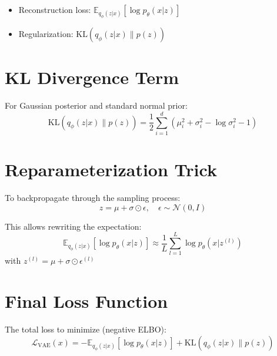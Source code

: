 \documentclass{article}
\begin{document}
\begin{itemize}
    \item Reconstruction loss: $\mathbb{E}_{q_{\phi}(z|x)}[\log p_{\theta}(x|z)]$
    \item Regularization: $\mathrm{KL}(q_{\phi}(z|x) \| p(z))$
\end{itemize}

\section*{KL Divergence Term}

For Gaussian posterior and standard normal prior:
\[
\mathrm{KL}(q_{\phi}(z|x) \| p(z)) = \frac{1}{2} \sum_{i=1}^{d} \left( \mu_i^2 + \sigma_i^2 - \log \sigma_i^2 - 1 \right)
\]

\section*{Reparameterization Trick}

To backpropagate through the sampling process:
\[
z = \mu + \sigma \odot \epsilon, \quad \epsilon \sim \mathcal{N}(0, I)
\]

This allows rewriting the expectation:
\[
\mathbb{E}_{q_{\phi}(z|x)}[\log p_{\theta}(x|z)] \approx \frac{1}{L} \sum_{l=1}^{L} \log p_{\theta}(x | z^{(l)})
\]
with $z^{(l)} = \mu + \sigma \odot \epsilon^{(l)}$

\section*{Final Loss Function}

The total loss to minimize (negative ELBO):
\[
\mathcal{L}_{\text{VAE}}(x) = -\mathbb{E}_{q_{\phi}(z|x)}[\log p_{\theta}(x|z)] + \mathrm{KL}(q_{\phi}(z|x) \| p(z))
\]
\end{document}

